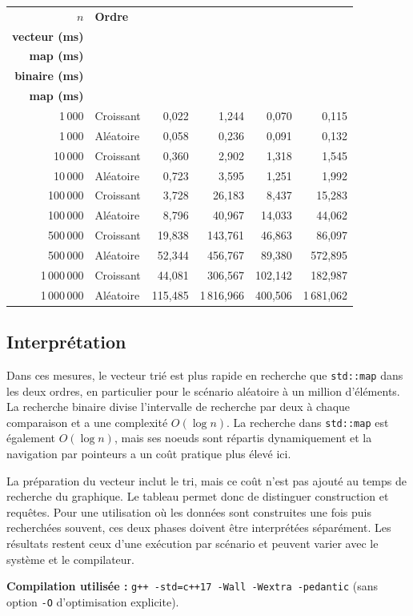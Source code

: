 \documentclass[10pt,a4paper]{article}
\begin{document}
\begin{center}
\begin{tabular}{@{}r l r r r r@{}}
\toprule
\textbf{$n$} & \textbf{Ordre} & \shortstack{\textbf{Préparation}\\\textbf{vecteur (ms)}}
& \shortstack{\textbf{Construction}\\\textbf{map (ms)}}
& \shortstack{\textbf{Recherche}\\\textbf{binaire (ms)}}
& \shortstack{\textbf{Recherche}\\\textbf{map (ms)}}\\
\midrule
1\,000     & Croissant & 0,022   & 1,244    & 0,070   & 0,115\\
1\,000     & Aléatoire & 0,058   & 0,236    & 0,091   & 0,132\\
10\,000    & Croissant & 0,360   & 2,902    & 1,318   & 1,545\\
10\,000    & Aléatoire & 0,723  & 3,595    & 1,251   & 1,992\\
100\,000   & Croissant & 3,728   & 26,183   & 8,437   & 15,283\\
100\,000   & Aléatoire & 8,796  & 40,967   & 14,033  & 44,062\\
500\,000   & Croissant & 19,838  & 143,761  & 46,863  & 86,097\\
500\,000   & Aléatoire & 52,344 & 456,767  & 89,380  & 572,895\\
1\,000\,000 & Croissant & 44,081 & 306,567  & 102,142 & 182,987\\
1\,000\,000 & Aléatoire & 115,485 & 1\,816,966 & 400,506 & 1\,681,062\\
\bottomrule
\end{tabular}
\end{center}

\normalsize
\subsection{Interprétation}
Dans ces mesures, le vecteur trié est plus rapide en recherche que
\texttt{std::map} dans les deux ordres, en particulier pour le scénario
aléatoire à un million d'éléments. La recherche binaire divise l'intervalle
de recherche par deux à chaque comparaison et a une complexité
$O(\log n)$. La recherche dans \texttt{std::map} est également
$O(\log n)$, mais ses noeuds sont répartis dynamiquement et la navigation
par pointeurs a un coût pratique plus élevé ici.

La préparation du vecteur inclut le tri, mais ce coût n'est pas ajouté au
temps de recherche du graphique. Le tableau permet donc de distinguer
construction et requêtes. Pour une utilisation où les données sont
construites une fois puis recherchées souvent, ces deux phases doivent
être interprétées séparément. Les résultats restent ceux d'une exécution
par scénario et peuvent varier avec le système et le compilateur.

\textbf{\color{bleu}Compilation utilisée :}
\texttt{g++ -std=c++17 -Wall -Wextra -pedantic} (sans option
\texttt{-O} d'optimisation explicite).
\end{document}
